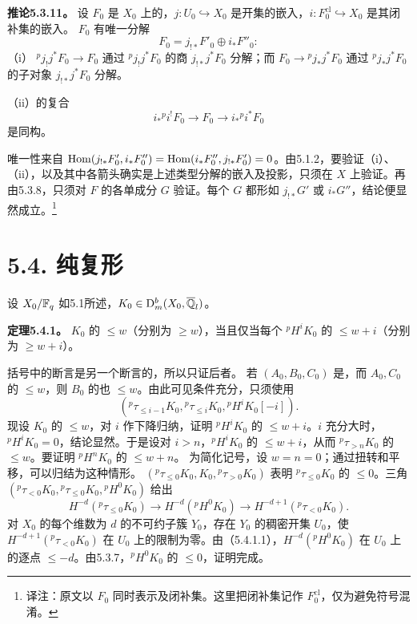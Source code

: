 \par\medskip\noindent\textbf{推论5.3.11。} 设 $F_0$ 是 $X_0$ 上的，$j:U_0\hookrightarrow X_0$ 是开集的嵌入，$i:F_0^{\mathrm{cl}}\hookrightarrow X_0$ 是其闭补集的嵌入。 $F_0$ 有唯一分解
\[
F_0=j_{!*}F'_0\oplus i_*F''_0:
\]
（i） ${}^pj_!j^*F_0\to F_0$ 通过 ${}^pj_!j^*F_0$ 的商 $j_{!*}j^*F_0$ 分解；而 $F_0\to{}^pj_*j^*F_0$ 通过 ${}^pj_*j^*F_0$ 的子对象 $j_{!*}j^*F_0$ 分解。

（ii）的复合
\[
i_*{}^pi^!F_0\longrightarrow F_0\longrightarrow i_*{}^pi^*F_0
\]
是同构。

唯一性来自 $\operatorname{Hom}(j_{!*}F'_0,i_*F''_0)=\operatorname{Hom}(i_*F''_0,j_{!*}F'_0)=0$。由5.1.2，要验证（i）、（ii），以及其中各箭头确实是上述类型分解的嵌入及投影，只须在 $X$ 上验证。再由5.3.8，只须对 $F$ 的各单成分 $G$ 验证。每个 $G$ 都形如 $j_{!*}G'$ 或 $i_*G''$，结论便显然成立。\footnote{译注：原文以 $F_0$ 同时表示及闭补集。这里把闭补集记作 $F_0^{\mathrm{cl}}$，仅为避免符号混淆。}

\section*{5.4. 纯复形}
设 $X_0/\mathbb F_q$ 如5.1所述，$K_0\in\mathrm{D}_m^b(X_0,\overline{\mathbb Q}_l)$。
\par\medskip\noindent\textbf{定理5.4.1。} $K_0$ 的 $\le w$（分别为 $\ge w$），当且仅当每个 ${}^pH^iK_0$ 的 $\le w+i$（分别为 $\ge w+i$）。

括号中的断言是另一个断言的，所以只证后者。
若 $(A_0,B_0,C_0)$ 是，而 $A_0,C_0$ 的 $\le w$，则 $B_0$ 的也 $\le w$。由此可见条件充分，只须使用
\[
({}^p\tau_{\le i-1}K_0,{}^p\tau_{\le i}K_0,{}^pH^iK_0[-i]).
\]
现设 $K_0$ 的 $\le w$，对 $i$ 作下降归纳，证明 ${}^pH^iK_0$ 的 $\le w+i$。$i$ 充分大时，${}^pH^iK_0=0$，结论显然。于是设对 $i>n$，${}^pH^iK_0$ 的 $\le w+i$，从而 ${}^p\tau_{>n}K_0$ 的 $\le w$。要证明 ${}^pH^nK_0$ 的 $\le w+n$。
为简化记号，设 $w=n=0$；通过扭转和平移，可以归结为这种情形。
 $({}^p\tau_{\le0}K_0,K_0,{}^p\tau_{>0}K_0)$ 表明 ${}^p\tau_{\le0}K_0$ 的 $\le0$。三角 $({}^p\tau_{<0}K_0,{}^p\tau_{\le0}K_0,{}^pH^0K_0)$ 给出
\begin{equation*}
H^{-d}({}^p\tau_{\le0}K_0)\longrightarrow H^{-d}({}^pH^0K_0)\longrightarrow H^{-d+1}({}^p\tau_{<0}K_0).\tag{5.4.1.1}
\end{equation*}
对 $X_0$ 的每个维数为 $d$ 的不可约子簇 $Y_0$，存在 $Y_0$ 的稠密开集 $U_0$，使 $H^{-d+1}({}^p\tau_{<0}K_0)$ 在 $U_0$ 上的限制为零。由（5.4.1.1），$H^{-d}({}^pH^0K_0)$ 在 $U_0$ 上的逐点 $\le-d$。由5.3.7，${}^pH^0K_0$ 的 $\le0$，证明完成。

